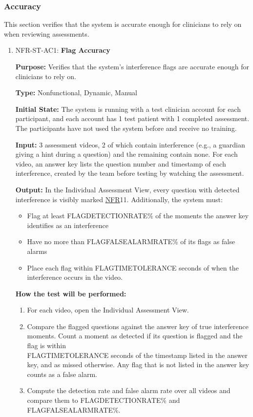 \documentclass[12pt, titlepage]{article}
\newcommand{\srsnfr}[1]{\href{https://github.com/Nour-Fawaz/MacaBoca/blob/main/pdfs/SRS/SRS.pdf}{NFR}}
\renewcommand{\_}{\oldunderscore\allowbreak}
\begin{document}
\subsubsection{Accuracy}
This section verifies that the system is accurate enough for clinicians to rely on when reviewing assessments.
\begin{enumerate}
  \item NFR-ST-AC1: \textbf{Flag Accuracy\\}
  \begin{mdframed}[linewidth=0.5mm]
      \textbf{Purpose:} Verifies that the system's interference flags are accurate enough for clinicians to rely on. \par
      \textbf{Type:} Nonfunctional, Dynamic, Manual \par
      \textbf{Initial State:} The system is running with a test clinician account for each participant, and each account has 1 test patient with 1 completed assessment. The participants have not used the system before and receive no training. \par
      \textbf{Input:} 3 assessment videos, 2 of which contain interference (e.g., a guardian giving a hint during a question) and the remaining contain none. For each video, an answer key lists the question number and timestamp of each interference, created by the team before testing by watching the assessment. \par
      \textbf{Output:} In the Individual Assessment View, every question with detected interference is visibly marked \srsnfr*{11}. Additionally, the system must:
      \begin{itemize}
        \item Flag at least FLAG\_DETECTION\_RATE\% of the moments the answer key identifies as an interference 
        \item Have no more than FLAG\_FALSE\_ALARM\_RATE\% of its flags as false alarms
        \item Place each flag within FLAG\_TIME\_TOLERANCE seconds of when the interference occurs in the video.
      \end{itemize}
      \textbf{How the test will be performed:}
      \begin{enumerate}
      \item[1.] For each video, open the Individual Assessment View.
      \item[2.] Compare the flagged questions against the answer key of true interference moments. Count a moment as detected if its question is flagged and the flag is within \\ FLAG\_TIME\_TOLERANCE seconds of the timestamp listed in the answer key, and as missed otherwise. Any flag that is not listed in the answer key counts as a false alarm.
      \item[3.] Compute the detection rate and false alarm rate over all videos and compare them to FLAG\_DETECTION\_RATE\% and FLAG\_FALSE\_ALARM\_RATE\%.

      \end{enumerate}
  \end{mdframed}
\end{enumerate}
\end{document}
